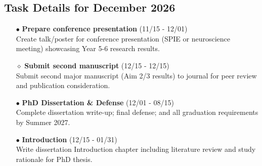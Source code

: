 \documentclass[landscape,a4paper]{article}
\begin{document}
\vspace{0.5cm}
\subsection{Task Details for December 2026}
\begin{itemize}[leftmargin=1cm]
    \item[\textcolor{researchout}{$\bullet$}] \textbf{Prepare conference presentation} (11/15 - 12/01)\\ Create talk/poster for conference presentation (SPIE or neuroscience meeting) showcasing Year 5-6 research results.
    \item[\textcolor{researchout}{$\diamond$}] \textbf{Submit second manuscript} (12/15 - 12/15)\\ Submit second major manuscript (Aim 2/3 results) to journal for peer review and publication consideration.
    \item[\textcolor{other}{$\bullet$}] \textbf{PhD Dissertation \& Defense} (12/01 - 08/15)\\ Complete dissertation write-up; final defense; and all graduation requirements by Summer 2027.
    \item[\textcolor{other}{$\bullet$}] \textbf{Introduction} (12/15 - 01/31)\\ Write dissertation Introduction chapter including literature review and study rationale for PhD thesis.
\end{itemize}
\end{document}
